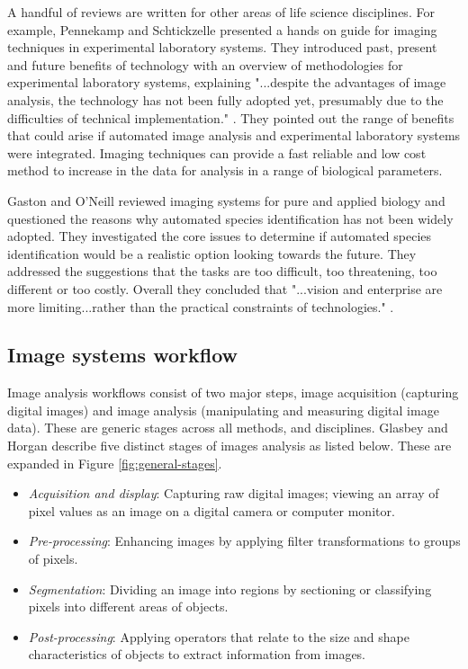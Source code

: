 A handful of reviews are written for other areas of life science disciplines. For example, Pennekamp and Schtickzelle \cite{Pennekamp2013}  presented a hands on guide for imaging techniques in experimental laboratory systems. They introduced past, present and future benefits of technology with an overview of methodologies for experimental laboratory systems, explaining "...despite the advantages of image analysis, the technology has not been fully adopted yet, presumably due to the difficulties of technical implementation." \cite[pg.485]{Pennekamp2013}. They pointed out the range of benefits that could arise if automated image analysis and experimental laboratory systems were integrated. Imaging techniques can provide a fast reliable and low cost method to increase in the data for analysis in a range of biological parameters.

Gaston and O'Neill \cite{Gaston2004} reviewed imaging systems for pure and applied biology  and questioned the reasons why automated species identification has not been widely adopted. They investigated the core issues to determine if automated species identification would be a realistic option looking towards the future. They addressed the suggestions that the tasks are too difficult, too threatening, too different or too costly. Overall they concluded that "...vision and enterprise are more limiting...rather than the practical constraints of technologies." \cite [pg.1]{Gaston2004}.

\subsection{Image systems workflow}
Image analysis workflows consist of two major steps, image acquisition (capturing digital images) and image analysis (manipulating and measuring digital image data). These are generic stages across all methods, and disciplines. Glasbey and Horgan \cite{Glasbey1995} describe five distinct stages of images analysis as listed below. These are expanded in Figure \ref{fig:general-stages}.

\begin{itemize}
\item \emph{Acquisition and display}:  Capturing raw digital images; viewing an array of pixel values as an image on a digital camera or computer monitor.
\item \emph{Pre-processing}: Enhancing images by applying filter transformations to groups of pixels.
\item \emph{Segmentation}: Dividing an image into regions by sectioning or classifying pixels into different areas of objects.
\item \emph{Post-processing}: Applying operators that relate to the size and shape characteristics of objects to extract information from images.
\end{itemize}

